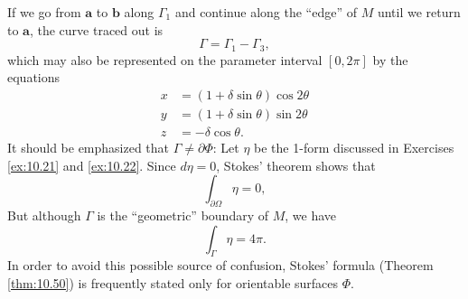\begin{myexercise}
    If we go from $\mathbf{a}$ to $\mathbf{b}$ along $\Gamma_1$ and continue along the ``edge'' of $M$ until we return to $\mathbf{a}$,
    the curve traced out is
    \begin{equation*}
        \Gamma =
        \Gamma_1 -
        \Gamma_3 ,
    \end{equation*}
    which may also be represented on the parameter interval $[0, 2\pi]$ by the equations
    \begin{align*}
        x & = (1 + \delta \sin \theta) \cos 2 \theta \\
        y & = (1 + \delta \sin \theta) \sin 2 \theta \\
        z & = -\delta \cos \theta .
    \end{align*}
    It should be emphasized that $\Gamma \neq \partial\Phi$:
    Let $\eta$ be the 1-form discussed in Exercises \ref{ex:10.21} and \ref{ex:10.22}.
    Since $d\eta = 0$, Stokes' theorem shows that
    \begin{equation*}
        \int_{\partial\Omega} \eta = 0,
    \end{equation*}
    But although $\Gamma$ is the ``geometric'' boundary of $M$, we have
    \begin{equation*}
        \int_{\Gamma} \eta = 4 \pi .
    \end{equation*}
    In order to avoid this possible source of confusion, Stokes' formula
    (Theorem \ref{thm:10.50}) is frequently stated only for orientable surfaces $\Phi$.
\end{myexercise}


